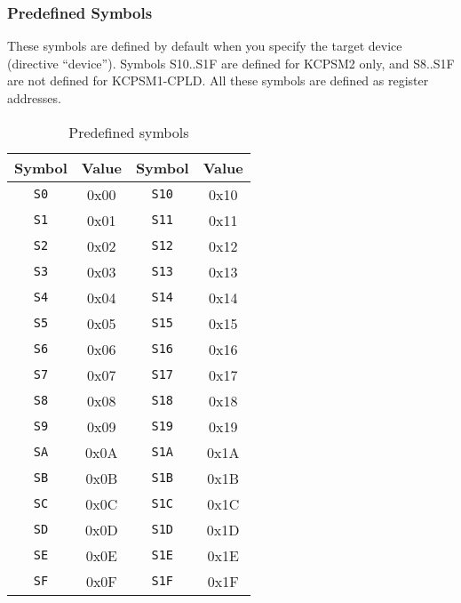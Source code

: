         \clearpage
        \subsubsection{Predefined Symbols}
            These symbols are defined by default when you specify the target device (directive ``device''). Symbols S10..S1F are defined for KCPSM2 only, and S8..S1F are not defined for KCPSM1-CPLD. All these symbols are defined as register addresses.

            \begin{table}[h!]
                \centering
                \begin{tabular}{|cc|cc|}
                    \hline
                    \textbf{Symbol} & \textbf{Value} & \textbf{Symbol} & \textbf{Value} \\\hline
                    \texttt{S0}     & 0x00           & \texttt{S10}    & 0x10           \\\hline
                    \texttt{S1}     & 0x01           & \texttt{S11}    & 0x11           \\\hline
                    \texttt{S2}     & 0x02           & \texttt{S12}    & 0x12           \\\hline
                    \texttt{S3}     & 0x03           & \texttt{S13}    & 0x13           \\\hline
                    \texttt{S4}     & 0x04           & \texttt{S14}    & 0x14           \\\hline
                    \texttt{S5}     & 0x05           & \texttt{S15}    & 0x15           \\\hline
                    \texttt{S6}     & 0x06           & \texttt{S16}    & 0x16           \\\hline
                    \texttt{S7}     & 0x07           & \texttt{S17}    & 0x17           \\\hline
                    \texttt{S8}     & 0x08           & \texttt{S18}    & 0x18           \\\hline
                    \texttt{S9}     & 0x09           & \texttt{S19}    & 0x19           \\\hline
                    \texttt{SA}     & 0x0A           & \texttt{S1A}    & 0x1A           \\\hline
                    \texttt{SB}     & 0x0B           & \texttt{S1B}    & 0x1B           \\\hline
                    \texttt{SC}     & 0x0C           & \texttt{S1C}    & 0x1C           \\\hline
                    \texttt{SD}     & 0x0D           & \texttt{S1D}    & 0x1D           \\\hline
                    \texttt{SE}     & 0x0E           & \texttt{S1E}    & 0x1E           \\\hline
                    \texttt{SF}     & 0x0F           & \texttt{S1F}    & 0x1F           \\\hline
                \end{tabular}
                \caption{Predefined symbols}
            \end{table}

